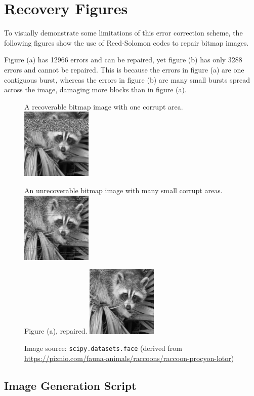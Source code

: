 \appendix
\appendixpage
\addappheadtotoc

\chapter{Recovery Figures}
\label{appendix:bitmap-errors}

To visually demonstrate some limitations of this error correction scheme, the following figures show the use of Reed-Solomon codes to repair bitmap images.

Figure (a) has 12966 errors and can be repaired, yet figure (b) has only 3288 errors and cannot be repaired.
This is because the errors in figure (a) are one contiguous burst, whereas the errors in figure (b) are many small bursts spread across the image, damaging more blocks than in figure (a).

\begin{figure}[H]
    \centering
    \begin{subcaptionbox}{A recoverable bitmap image with one corrupt area.}
        {\includegraphics[width=0.3\textwidth]{face_2.png}}
    \end{subcaptionbox}
    \hfill
    \begin{subcaptionbox}{An unrecoverable bitmap image with many small corrupt areas.}
        {\includegraphics[width=0.3\textwidth]{face_3.png}}
    \end{subcaptionbox}
    \hfill
    \begin{subcaptionbox}{Figure (a), repaired.}
        {\includegraphics[width=0.3\textwidth]{face_2_repaired.png}}
    \end{subcaptionbox}
    
    \caption{Image source: \texttt{scipy.datasets.face} (derived from \url{https://pixnio.com/fauna-animals/raccoons/raccoon-procyon-lotor})}
\end{figure}

\clearpage

\section{Image Generation Script}

\tiny


\clearpage
